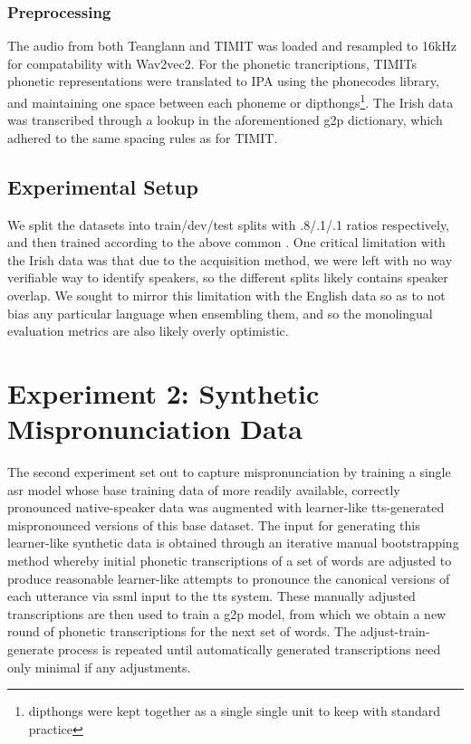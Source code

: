 \documentclass[thesis]{cluu}
\begin{document}
\subsubsection{Preprocessing}
The audio from both Teanglann and TIMIT was loaded and resampled to 16kHz for compatability with Wav2vec2. For the phonetic trancriptions, TIMITs phonetic representations were translated to IPA using the phonecodes library, and maintaining one space between each phoneme or dipthongs\footnote{dipthongs were kept together as a single single unit to keep with standard practice}. The Irish data was transcribed through a lookup in the aforementioned \gls{g2p} dictionary, which adhered to the same spacing rules as for TIMIT.

\subsection{Experimental Setup}
We split the datasets into train/dev/test splits with .8/.1/.1 ratios respectively, and then trained according to the above common . One critical limitation with the Irish data was that due to the acquisition method, we were left with no way verifiable way to identify speakers, so the different splits likely contains speaker overlap. We sought to mirror this limitation with the English data so as to not bias any particular language when ensembling them, and so the monolingual evaluation metrics are also likely overly optimistic. 

\section{Experiment 2: Synthetic Mispronunciation Data}
The second experiment set out to capture mispronunciation by training a single \gls{asr} model whose base training data of more readily available, correctly pronounced native-speaker data was augmented with learner-like \gls{tts}-generated mispronounced versions of this base dataset. The input for generating this learner-like synthetic data is obtained through an iterative manual bootstrapping method whereby initial phonetic transcriptions of a set of words are adjusted to produce reasonable learner-like attempts to pronounce the canonical versions of each utterance via \gls{ssml} input to the \gls{tts} system. These manually adjusted transcriptions are then used to train a \gls{g2p} model, from which we obtain a new round of phonetic transcriptions for the next set of words. The adjust-train-generate process is repeated until automatically generated transcriptions need only minimal if any adjustments.
\end{document}
